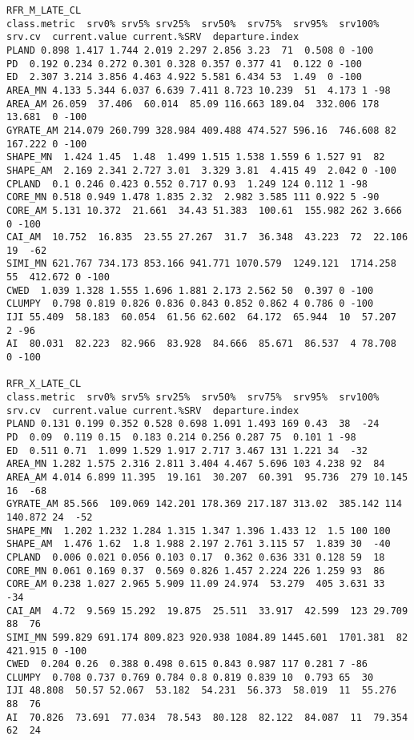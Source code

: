 \begin{verbatim}
RFR_M_LATE_CL                     
class.metric  srv0% srv5% srv25%  srv50%  srv75%  srv95%  srv100% srv.cv  current.value current.%SRV  departure.index
PLAND 0.898 1.417 1.744 2.019 2.297 2.856 3.23  71  0.508 0 -100
PD  0.192 0.234 0.272 0.301 0.328 0.357 0.377 41  0.122 0 -100
ED  2.307 3.214 3.856 4.463 4.922 5.581 6.434 53  1.49  0 -100
AREA_MN 4.133 5.344 6.037 6.639 7.411 8.723 10.239  51  4.173 1 -98
AREA_AM 26.059  37.406  60.014  85.09 116.663 189.04  332.006 178 13.681  0 -100
GYRATE_AM 214.079 260.799 328.984 409.488 474.527 596.16  746.608 82  167.222 0 -100
SHAPE_MN  1.424 1.45  1.48  1.499 1.515 1.538 1.559 6 1.527 91  82
SHAPE_AM  2.169 2.341 2.727 3.01  3.329 3.81  4.415 49  2.042 0 -100
CPLAND  0.1 0.246 0.423 0.552 0.717 0.93  1.249 124 0.112 1 -98
CORE_MN 0.518 0.949 1.478 1.835 2.32  2.982 3.585 111 0.922 5 -90
CORE_AM 5.131 10.372  21.661  34.43 51.383  100.61  155.982 262 3.666 0 -100
CAI_AM  10.752  16.835  23.55 27.267  31.7  36.348  43.223  72  22.106  19  -62
SIMI_MN 621.767 734.173 853.166 941.771 1070.579  1249.121  1714.258  55  412.672 0 -100
CWED  1.039 1.328 1.555 1.696 1.881 2.173 2.562 50  0.397 0 -100
CLUMPY  0.798 0.819 0.826 0.836 0.843 0.852 0.862 4 0.786 0 -100
IJI 55.409  58.183  60.054  61.56 62.602  64.172  65.944  10  57.207  2 -96
AI  80.031  82.223  82.966  83.928  84.666  85.671  86.537  4 78.708  0 -100

RFR_X_LATE_CL                     
class.metric  srv0% srv5% srv25%  srv50%  srv75%  srv95%  srv100% srv.cv  current.value current.%SRV  departure.index
PLAND 0.131 0.199 0.352 0.528 0.698 1.091 1.493 169 0.43  38  -24
PD  0.09  0.119 0.15  0.183 0.214 0.256 0.287 75  0.101 1 -98
ED  0.511 0.71  1.099 1.529 1.917 2.717 3.467 131 1.221 34  -32
AREA_MN 1.282 1.575 2.316 2.811 3.404 4.467 5.696 103 4.238 92  84
AREA_AM 4.014 6.899 11.395  19.161  30.207  60.391  95.736  279 10.145  16  -68
GYRATE_AM 85.566  109.069 142.201 178.369 217.187 313.02  385.142 114 140.872 24  -52
SHAPE_MN  1.202 1.232 1.284 1.315 1.347 1.396 1.433 12  1.5 100 100
SHAPE_AM  1.476 1.62  1.8 1.988 2.197 2.761 3.115 57  1.839 30  -40
CPLAND  0.006 0.021 0.056 0.103 0.17  0.362 0.636 331 0.128 59  18
CORE_MN 0.061 0.169 0.37  0.569 0.826 1.457 2.224 226 1.259 93  86
CORE_AM 0.238 1.027 2.965 5.909 11.09 24.974  53.279  405 3.631 33  -34
CAI_AM  4.72  9.569 15.292  19.875  25.511  33.917  42.599  123 29.709  88  76
SIMI_MN 599.829 691.174 809.823 920.938 1084.89 1445.601  1701.381  82  421.915 0 -100
CWED  0.204 0.26  0.388 0.498 0.615 0.843 0.987 117 0.281 7 -86
CLUMPY  0.708 0.737 0.769 0.784 0.8 0.819 0.839 10  0.793 65  30
IJI 48.808  50.57 52.067  53.182  54.231  56.373  58.019  11  55.276  88  76
AI  70.826  73.691  77.034  78.543  80.128  82.122  84.087  11  79.354  62  24


\end{verbatim}
